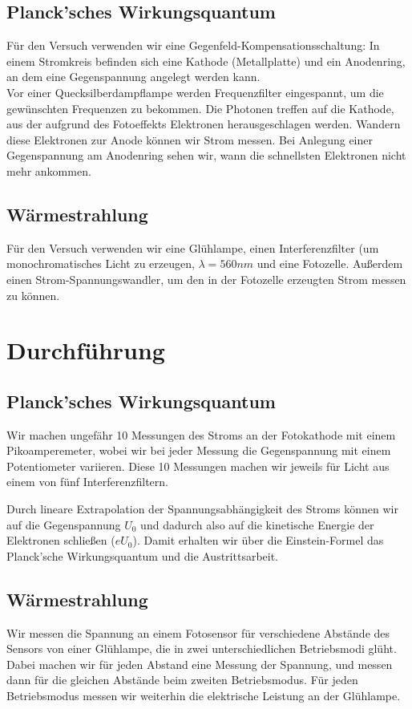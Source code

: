 \documentclass[12pt,a4paper,twopage]{article}
\begin{document}
\subsection{Planck'sches Wirkungsquantum}
Für den Versuch verwenden wir eine Gegenfeld-Kompensationsschaltung: In einem Stromkreis befinden sich eine Kathode (Metallplatte) und ein Anodenring, an dem eine Gegenspannung angelegt werden kann.\\
Vor einer Quecksilberdampflampe werden Frequenzfilter eingespannt, um die gewünschten Frequenzen zu bekommen. Die Photonen treffen auf die Kathode, aus der aufgrund des Fotoeffekts Elektronen herausgeschlagen werden. Wandern diese Elektronen zur Anode können wir Strom messen. Bei Anlegung einer Gegenspannung am Anodenring sehen wir, wann die schnellsten Elektronen nicht mehr ankommen.

\subsection{Wärmestrahlung}
Für den Versuch verwenden wir eine Glühlampe, einen Interferenzfilter (um monochromatisches Licht zu erzeugen, $\lambda=560\si{nm}$ und eine Fotozelle. Außerdem einen Strom-Spannungswandler, um den in der Fotozelle erzeugten Strom messen zu können.

\section{Durchführung}
\subsection{Planck'sches Wirkungsquantum}
Wir machen ungefähr 10 Messungen des Stroms an der Fotokathode mit einem Pikoamperemeter, wobei wir bei jeder Messung die Gegenspannung mit einem Potentiometer variieren. Diese 10 Messungen machen wir jeweils für Licht aus einem von fünf Interferenzfiltern.  

Durch lineare Extrapolation der Spannungsabhängigkeit des Stroms können wir auf die Gegenspannung $U_0$ und dadurch also auf die kinetische Energie der Elektronen schließen ($eU_0$). Damit erhalten wir über die Einstein-Formel das Planck'sche Wirkungsquantum und die Austrittsarbeit.

\subsection{Wärmestrahlung}
Wir messen die Spannung an einem Fotosensor für verschiedene Abstände des Sensors von einer Glühlampe, die in zwei unterschiedlichen Betriebsmodi glüht. Dabei machen wir für jeden Abstand eine Messung der Spannung, und messen dann für die gleichen Abstände beim zweiten Betriebsmodus. Für jeden Betriebsmodus messen wir weiterhin die elektrische Leistung an der Glühlampe.
\end{document}
